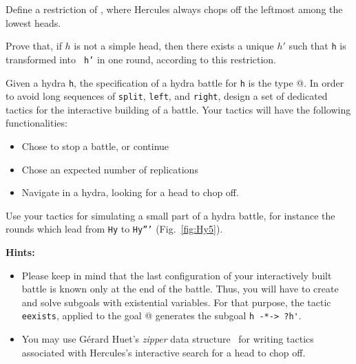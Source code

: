 
\begin{exercise}
Define a restriction of ,  where Hercules always chops off
the leftmost among the lowest heads.

Prove that, if $h$ is not a simple head, then there exists a unique $h'$ such that \texttt{h}  is transformed into \texttt{ h'} in one round, according to this restriction.


\end{exercise}


\begin{exercise}
\label{exo:interactive-battle}
Given a hydra \texttt{h}, the specification of a hydra battle for \texttt{h} is the type 
@. In order to avoid long sequences of \texttt{split}, \texttt{left}, and 
\texttt{right}, design a set of dedicated tactics for the interactive building of a battle.
Your tactics will have the following functionalities:
\begin{itemize}
\item  Chose to stop a battle, or continue
\item Chose an expected number of replications
\item Navigate in a hydra, looking for a head to chop off.
\end{itemize}

Use your tactics for simulating a small part of a hydra battle, for instance the rounds which lead from
\texttt{Hy} to \texttt{Hy'''}  (Fig.~\vref{fig:Hy5}).

\textbf{Hints:} 
\begin{itemize}

\item Please keep in mind that the last  configuration of your interactively built battle is known only at the end of the battle. Thus, you will have to create and solve subgoals with existential variables. For that purpose, the tactic \texttt{eexists}, applied to the 
goal @ generates the subgoal \Verb|h -*-> ?h'|.
\item You may use Gérard Huet's \emph{zipper} data structure~\cite{zipper} for writing tactics associated with Hercules's  interactive search for a head to chop off.
\end{itemize}






\end{exercise}




